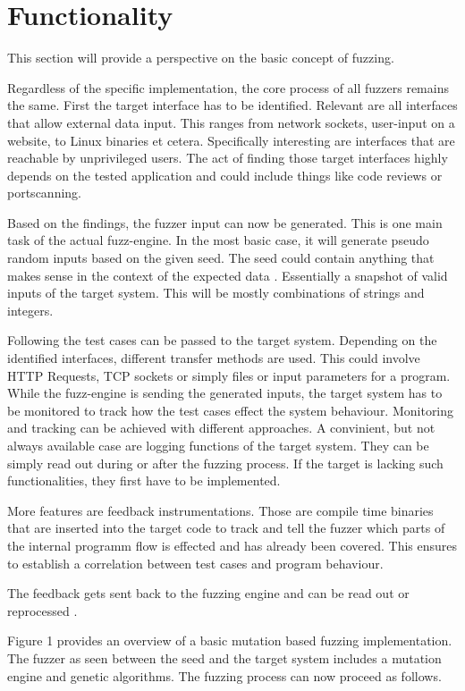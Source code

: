 \documentclass[journal=tosc,final]{iacrtrans}
\begin{document}
\section{Functionality}
This section will provide a perspective on the basic concept of fuzzing.

Regardless of the specific implementation, the core process of all fuzzers remains the same. First the target interface has to be identified. Relevant are all interfaces that allow external data input. This ranges from network sockets, user-input on a website, to Linux binaries et cetera. Specifically interesting are interfaces that are reachable by unprivileged users. The act of finding those target interfaces highly depends on the tested application and could include things like code reviews or portscanning. 


Based on the findings, the fuzzer input can now be generated. This is one main task of the actual fuzz-engine. In the most basic case, it will generate pseudo random inputs based on the given seed. The seed could contain anything that makes sense in the context of the expected data \cite{li2018fuzzing}. Essentially a snapshot of valid inputs of the target system. This will be mostly combinations of strings and integers. 

Following the test cases can be passed to the  target system. Depending on the identified interfaces, different transfer methods are used. This could involve HTTP Requests, TCP sockets or simply files or input parameters for a program. While the fuzz-engine is sending the generated inputs, the target system has to be monitored to track how the test cases effect the system behaviour. Monitoring and tracking can be achieved with different approaches. A convinient, but not always available case are logging functions of the target system. They can be simply read out during or after the fuzzing process. If the target is lacking such functionalities, they first have to be implemented. 

More features are feedback instrumentations. Those are compile time binaries that are inserted into the target code to track and tell the fuzzer which parts of the internal programm flow is effected and has already been covered. This ensures to establish a correlation between test cases and program behaviour. 

The feedback gets sent back to the fuzzing engine and can be read out or reprocessed \cite{algo}.


Figure 1 provides an overview of a basic mutation based fuzzing implementation. The fuzzer as seen between the seed and the target system includes a mutation engine and genetic algorithms. The fuzzing process can now proceed as follows.
\end{document}
